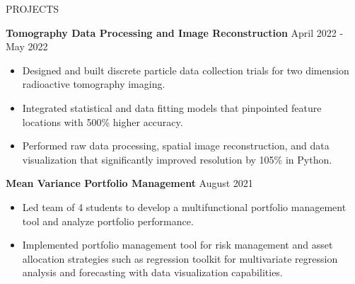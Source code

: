 \documentclass{resume} %
\begin{document}
\vspace{-0.5em}
\begin{rSection}{PROJECTS}
\vspace{-1.25em}

\item \textbf{Tomography Data Processing and Image Reconstruction} \hfill April 2022 - May 2022
\begin{itemize}
   \vspace{-0.4em}
   \itemsep -5.8pt {}
   \item Designed and built discrete particle data collection trials for two dimension radioactive tomography imaging.
   \item Integrated statistical and data fitting models that pinpointed feature locations with 500\% higher accuracy.
   \item Performed raw data processing, spatial image reconstruction, and data visualization that significantly improved resolution by 105\% in Python.
   
\end{itemize}

\item \textbf{Mean Variance Portfolio Management} \hfill August 2021
\begin{itemize}
   \vspace{-0.4em}
   \itemsep -5.8pt {}
   \item Led team of 4 students to develop a multifunctional portfolio management tool and analyze portfolio performance.
   \item Implemented portfolio management tool for risk management and asset allocation strategies such as regression toolkit for multivariate regression analysis and forecasting with data visualization capabilities.
   
\end{itemize}


\end{rSection} 
\end{document}
